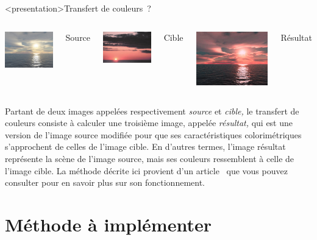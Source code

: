\begin{frame}<presentation>{Transfert de couleurs~?}
  \begin{columns}
    \column{6cm}
    \centering
    \includegraphics[width=4cm]{source}

    Source

    \vspace{2ex}
    \includegraphics[width=4cm]{target}

    Cible

    \pause

    \column{6cm}
    \centering
    \includegraphics[width=6cm]{srcsourcetgttarget}

    Résultat
  \end{columns}
\end{frame}

Partant de deux images appelées respectivement \emph{source} et \emph{cible,}
le transfert de couleurs consiste à calculer une troisième image, appelée
\emph{résultat,} qui est une version de l'image source modifiée pour que ses
caractéristiques colorimétriques s'approchent de celles de l'image cible. En
d'autres termes, l'image résultat représente la scène de l'image source, mais
ses couleurs ressemblent à celle de l'image cible. La méthode décrite ici
provient d'un article~\cite{reinhard01:color_transfer} que vous pouvez
consulter pour en savoir plus sur son fonctionnement.


\section{Méthode à implémenter}
\label{sec:descr_meth}

